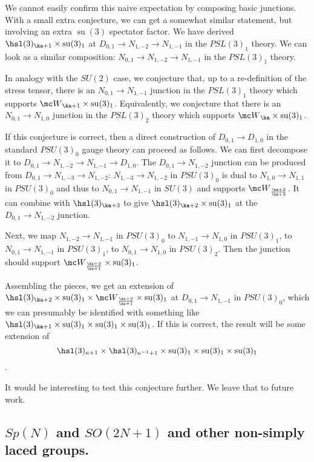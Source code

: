 \documentclass[11pt,reqno]{amsart}
\theoremstyle{plain}
\numberwithin{equation}{section}
\DeclareMathOperator{\tsu}{su}
\theoremstyle{definition}
\begin{document}
We cannot easily confirm this naive expectation by composing basic junctions. With a small extra conjecture, 
we can get a somewhat similar statement, but involving an extra $\tsu(3)$ spectator factor. We have derived 
$\hsl(3)_{\ka+1} \times \tsu(3)_1$ at $D_{0,1} \to N_{1,-2}\to N_{1,-1}$ in the $PSL(3)_1$ theory.
We can look as a similar composition: $N_{0,1} \to N_{1,-2}\to N_{1,-1}$ in the $PSL(3)_1$ theory.

In analogy with the $SU(2)$ case, we conjecture that, up to a re-definition of the stress tensor, 
there is an $N_{0,1} \to N_{1,-1}$ junction 
in the $PSL(3)_1$ theory which supports ${\mc W}_{\ka+1} \times \tsu(3)_1$.
Equivalently, we conjecture that there is an $N_{0,1} \to N_{1,0}$ junction 
in the $PSL(3)_2$ theory which supports ${\mc W}_{\ka} \times \tsu(3)_1$.

If this conjecture is correct, then a direct construction of $D_{0,1} \to D_{1,0}$ in the standard $PSU(3)_0$ gauge theory 
can proceed as follows. We can first decompose it to $D_{0,1} \to N_{1,-2} \to N_{1,-1} \to D_{1,0}$.
The $D_{0,1} \to N_{1,-2}$ junction can be produced from $D_{0,1} \to N_{1,-3}\to N_{1,-2}$:
$N_{1,-3}\to N_{1,-2}$ in $PSU(3)_0$ is dual to $N_{1,0} \to N_{1,1}$ in $PSU(3)_0$
and thus to $N_{0,1} \to N_{1,-1}$ in $SU(3)$ and supports ${\mc W}_{\frac{\ka+2}{\ka+3}}$.
It can combine with $\hsl(3)_{\ka+3}$ to give $\hsl(3)_{\ka+2} \times \tsu(3)_1$ at the $D_{0,1} \to N_{1,-2}$ junction.

Next, we map $N_{1,-2} \to N_{1,-1}$ in $PSU(3)_0$ to $N_{1,-1} \to N_{1,0}$ in $PSU(3)_1$,
to $N_{0,1} \to N_{1,-1}$ in $PSU(3)_1$, to $N_{0,1} \to N_{1,0}$ in $PSU(3)_2$. 
Then the junction should support ${\mc W}_{\frac{\ka+2}{\ka+1}} \times \tsu(3)_1$.

Assembling the pieces, we get an extension of $\hsl(3)_{\ka+2} \times \tsu(3)_1 \times {\mc W}_{\frac{\ka+2}{\ka+1}} \times \tsu(3)_1$
at $D_{0,1} \to N_{1,-1}$ in $PSU(3)_0$, which we can presumably be identified with something like 
 $\hsl(3)_{\ka+1} \times \tsu(3)_1 \times \tsu(3)_1 \times \tsu(3)_1$. If this is correct, the result will be some extension of 
 $$\hsl(3)_{\kappa+1} \times \hsl(3)_{\kappa^{-1}+1}\times \tsu(3)_1 \times \tsu(3)_1\times \tsu(3)_1$$.
 
 It would be interesting to test this conjecture further. We leave that to future work. 
 
\subsection{$Sp(N)$ and $SO(2N+1)$ and other non-simply laced groups.}
\end{document}
